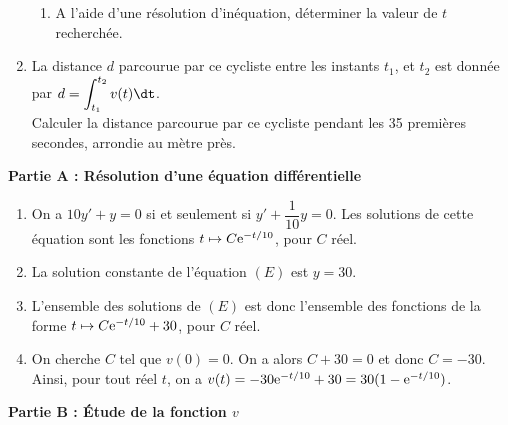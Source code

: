 \documentclass[11pt,fleqn, openany]{book} %
\begin{document}
\begin{exercise}[topic=int02]
\begin{enumerate}
\begin{enumerate}


\item A l'aide d'une résolution d'inéquation, déterminer la valeur de $t$ recherchée.
\end{enumerate}
   
    \item La distance $d$ parcourue par ce cycliste entre les instants $t_1$, et $t_2$ est donnée par $d=\displaystyle\int_{t_1}^{t_2}v(t)\dt$.\\
    Calculer la distance parcourue par ce cycliste pendant les 35 premières secondes, arrondie au mètre près.
\end{enumerate}

\end{exercise}

\begin{solution}

\textbf{Partie A : Résolution d'une équation différentielle}
\begin{enumerate}
\item On a $10y'+y=0$ si et seulement si $y'+\dfrac{1}{10}y=0$. Les solutions de cette équation sont les fonctions $t\mapsto C\mathrm{e}^{-t/10}$, pour $C$ réel.
\item La solution constante de l'équation $(E)$ est $y=30$.
\item L'ensemble des solutions de $(E)$ est donc l'ensemble des fonctions de la forme $t\mapsto C\mathrm{e}^{-t/10}+30$, pour $C$ réel.
\item On cherche $C$ tel que $v(0)=0$. On a alors $C+30=0$ et donc $C=-30$. Ainsi, pour tout réel $t$, on a $v(t)=-30\mathrm{e}^{-t/10}+30=30(1-\mathrm{e}^{-t/10})$.
\end{enumerate}

\textbf{Partie B : Étude de la fonction $v$}



\end{solution}
\end{document}
